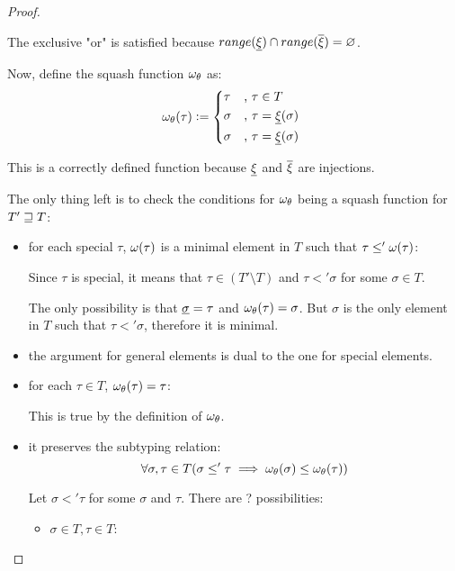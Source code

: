 \documentclass[main.tex]{subfiles}
\begin{document}
\begin{proof}
\begin{itemize}
            The exclusive "or" is satisfied because
            $range(\underline{\xi}) \cap range(\overline{\xi}) = \varnothing$.
    \end{itemize}

    Now, define the squash function $\omega_{\theta}$ as:
    \[
        \squash_{\theta}(\tau) \defeq
        \begin{cases*}
            \tau &, $\tau \in T$ \\
            \sigma &, $\tau = \subtyper{\xi}(\sigma)$ \\
            \sigma &, $\tau = \subtyper{\xi}(\sigma)$ \\
        \end{cases*}
    \]

    This is a correctly defined function because $\underline{\xi}$ and
    $\overline{\xi}$ are injections.

    The only thing left is to check the conditions for $\omega_{\theta}$
    being a squash function for $T' \sqsupseteq T$:

    \begin{itemize}
        \item for each special $\tau$, $\omega(\tau)$ is a minimal element in $T$ such that
            $\tau \leq' \omega(\tau)$:

            Since $\tau$ is special, it means that $\tau \in (T' \setminus T)$ and
            $\tau \less' \sigma$ for some $\sigma \in T$.

            The only possibility is that $\underline{\sigma} = \tau$ and
            $\omega_{\theta}(\tau) = \sigma$. But $\sigma$ is the only element
            in $T$ such that $\tau \less' \sigma$, therefore it is minimal.
        \item the argument for general elements is dual to the one
            for special elements.

        \item for each $\tau \in T$, $\omega_{\theta}(\tau) = \tau$:

            This is true by the definition of $\omega_{\theta}$.

        \item it preserves the subtyping relation:
            \[ \forall \sigma, \tau \in T (\sigma \leq' \tau \implies
                \omega_{\theta}(\sigma) \leq \omega_{\theta}(\tau)) \]

            Let $\sigma \less' \tau$ for some $\sigma$ and $\tau$.
            There are ? possibilities:
            \begin{itemize}
                \item $\sigma \in T, \tau \in T$:


\end{itemize}
\end{itemize}
\end{proof}
\end{document}

